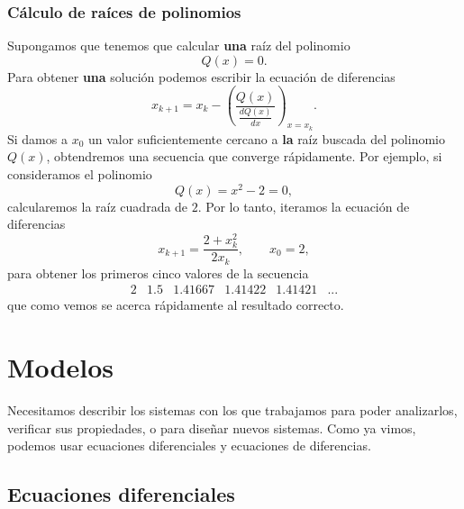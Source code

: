 \subsubsection{Cálculo de raíces de polinomios}
Supongamos que tenemos que calcular \textbf{una} raíz del polinomio
\begin{equation}
	Q(x) = 0.
\end{equation}
Para obtener \textbf{una} solución podemos escribir la ecuación de diferencias
\begin{equation}
	x_{k+1} = x_{k} - \left(\frac{Q(x)}{\frac{d Q(x)}{dx}}\right)_{x=x_{k}}.
\end{equation}
Si damos a $x_{0}$ un valor suficientemente cercano a \textbf{la} raíz buscada del polinomio $Q(x)$, obtendremos una secuencia que converge rápidamente. Por ejemplo, si consideramos el polinomio
\begin{equation}
	Q(x) = x^{2} - 2 = 0, 
\end{equation}
calcularemos la raíz cuadrada de $2$. Por lo tanto, iteramos la ecuación de diferencias
\begin{equation}
	x_{k+1} = \frac{2 + x^{2}_{k}}{2 x_{k}}, \qquad x_{0} = 2,
\end{equation}
para obtener los primeros cinco valores de la secuencia
\begin{equation}
	\begin{array}{llllll}
		2 & 1.5 & 1.41667 & 1.41422 & 1.41421 & ...
	\end{array}
\end{equation}
que como vemos se acerca rápidamente al resultado correcto.


\section{Modelos}

Necesitamos describir los sistemas con los que trabajamos para poder analizarlos, verificar sus propiedades, o para diseñar nuevos sistemas. Como ya vimos, podemos usar ecuaciones diferenciales y ecuaciones de diferencias.

\subsection{Ecuaciones diferenciales}

